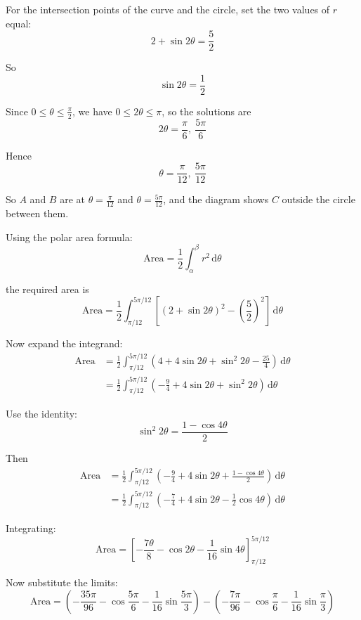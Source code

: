 \documentclass[leqno]{article}
\begin{document}
\begin{enumerate}[
	  label=\textbf{\arabic*.},
	  leftmargin=*,
	  topsep=0pt,
	  partopsep=0pt,
	  parsep=0pt
	]
	\vspace*{10pt}
	
	\begin{djsSolution}
	For the intersection points of the curve and the circle, set the two values of $r$ equal:
	\[
	2+\sin 2\theta=\frac52
	\]
	
	So
	\[
	\sin 2\theta=\frac12
	\]
	
	Since $0\le \theta \le \frac{\pi}{2}$, we have $0\le 2\theta \le \pi$, so the solutions are
	\[
	2\theta=\frac{\pi}{6},\ \frac{5\pi}{6}
	\]
	
	Hence
	\[
	\theta=\frac{\pi}{12},\ \frac{5\pi}{12}
	\]
	
	So $A$ and $B$ are at $\theta=\frac{\pi}{12}$ and $\theta=\frac{5\pi}{12}$, and the diagram shows $C$ outside the circle between them.

	Using the polar area formula:
	\[
	\text{Area}=\frac12\int_{\alpha}^{\beta} r^2\,\mathrm{d}\theta
	\]

	the required area is
	\[
	\text{Area}=\frac12\int_{\pi/12}^{5\pi/12}\left[\left(2+\sin 2\theta\right)^2-\left(\frac52\right)^2\right]\,\mathrm{d}\theta
	\]
	
	Now expand the integrand:
	\begin{align*}
	\text{Area}&=\frac12\int_{\pi/12}^{5\pi/12}\left(4+4\sin 2\theta+\sin^2 2\theta-\frac{25}{4}\right)\,\mathrm{d}\theta\\
	&=\frac12\int_{\pi/12}^{5\pi/12}\left(-\frac94+4\sin 2\theta+\sin^2 2\theta\right)\,\mathrm{d}\theta
	\end{align*}
	
	Use the identity:
	\[
	\sin^2 2\theta=\frac{1-\cos 4\theta}{2}
	\]
	
	Then
	\begin{align*}
	\text{Area}&=\frac12\int_{\pi/12}^{5\pi/12}\left(-\frac94+4\sin 2\theta+\frac{1-\cos 4\theta}{2}\right)\,\mathrm{d}\theta\\
	&=\frac12\int_{\pi/12}^{5\pi/12}\left(-\frac74+4\sin 2\theta-\frac12\cos 4\theta\right)\,\mathrm{d}\theta
	\end{align*}
	
	Integrating:
	\[
	\text{Area}=\left[-\frac{7\theta}{8}-\cos 2\theta-\frac{1}{16}\sin 4\theta\right]_{\pi/12}^{5\pi/12}
	\]
	
	Now substitute the limits:
	\[
	\text{Area}=\left(-\frac{35\pi}{96}-\cos\frac{5\pi}{6}-\frac{1}{16}\sin\frac{5\pi}{3}\right)
	-\left(-\frac{7\pi}{96}-\cos\frac{\pi}{6}-\frac{1}{16}\sin\frac{\pi}{3}\right)
	\]
	

\end{djsSolution}
\end{enumerate}
\end{document}
